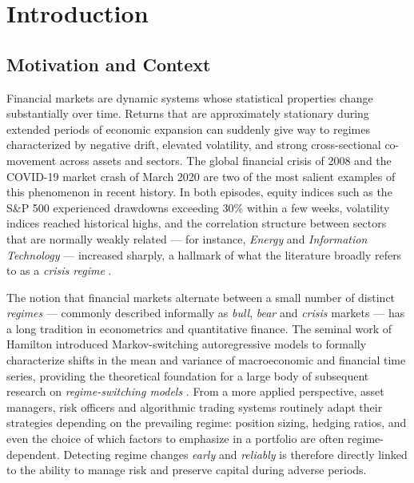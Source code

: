 \chapter{Introduction}
\label{ch:introduction}

\section{Motivation and Context}
\label{sec:motivation}

Financial markets are dynamic systems whose statistical properties change
substantially over time. Returns that are approximately stationary during
extended periods of economic expansion can suddenly give way to regimes
characterized by negative drift, elevated volatility, and strong
cross-sectional co-movement across assets and sectors. The global
financial crisis of 2008 and the COVID-19 market crash of March 2020 are
two of the most salient examples of this phenomenon in recent history. In
both episodes, equity indices such as the S\&P 500 experienced drawdowns
exceeding 30\% within a few weeks, volatility indices reached historical
highs, and the correlation structure between sectors that are normally
weakly related --- for instance, \textit{Energy} and \textit{Information
Technology} --- increased sharply, a hallmark of what the literature
broadly refers to as a \emph{crisis regime} \cite{ang2002regime}.

The notion that financial markets alternate between a small number of
distinct \emph{regimes} --- commonly described informally as
\emph{bull}, \emph{bear} and \emph{crisis} markets --- has a long
tradition in econometrics and quantitative finance. The seminal work of
Hamilton \cite{hamilton1989} introduced Markov-switching autoregressive
models to formally characterize shifts in the mean and variance of
macroeconomic and financial time series, providing the theoretical
foundation for a large body of subsequent research on
\emph{regime-switching models} \cite{guidolin2011}. From a more applied
perspective, asset managers, risk officers and algorithmic trading
systems routinely adapt their strategies depending on the prevailing
regime: position sizing, hedging ratios, and even the choice of which
factors to emphasize in a portfolio are often regime-dependent. Detecting
regime changes \emph{early} and \emph{reliably} is therefore directly
linked to the ability to manage risk and preserve capital during adverse
periods.


